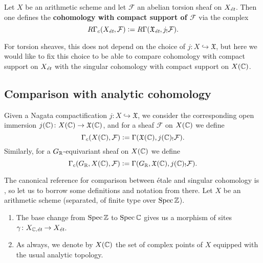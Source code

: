 \documentclass{article}
\numberwithin{equation}{section}
\begin{document}
\begin{appendices}
\begin{definition}
  Let $X$ be an arithmetic scheme and let $\mathcal{F}$ an abelian torsion
  sheaf on $X_\et$. Then one defines the
  \textbf{cohomology with compact support of $\mathcal{F}$} via the complex
  \begin{equation}
    \label{eqn:RGammac-via-extension-by-zero}
    R\Gamma_c (X_\et, \mathcal{F}) \dfn
    R\Gamma (\mathfrak{X}_\text{\it \'et}, j_! \mathcal{F}).
  \end{equation}
\end{definition}

For torsion sheaves, this does not depend on the choice of
$j\colon X \hookrightarrow \mathfrak{X}$, but here we would like to fix this
choice to be able to compare cohomology with compact support on $X_\et$ with
the singular cohomology with compact support on $X (\CC)$.

\subsection*{Comparison with analytic cohomology}

\begin{definition}
  Given a Nagata compactification $j\colon X\hookrightarrow \mathfrak{X}$,
  we consider the corresponding open immersion
  $j (\CC)\colon X (\CC) \to \mathfrak{X} (\CC)$,
  and for a sheaf $\mathcal{F}$ on $X (\CC)$ we define
  \[ \Gamma_c (X (\CC), \mathcal{F}) \dfn
  \Gamma (\mathfrak{X} (\CC), j (\CC)_! \mathcal{F}). \]
  Similarly, for a $G_\RR$-equivariant sheaf on $X (\CC)$ we define
  \[ \Gamma_c (G_\RR, X (\CC), \mathcal{F}) \dfn
  \Gamma (G_\RR, \mathfrak{X} (\CC), j (\CC)_! \mathcal{F}). \]
\end{definition}

The canonical reference for comparison between étale and singular cohomology is
\cite[Exposé~XI, \S 4]{SGA4}, so let us to borrow some definitions and notation
from there. Let $X$ be an arithmetic scheme (separated, of finite type over
$\Spec \ZZ$).

\begin{enumerate}
\item The base change from $\Spec \ZZ$ to $\Spec \CC$ gives us a morphism of
  sites
  $\gamma\colon X_{\CC,\text{\it ét}} \to X_\et$.

\item As always, we denote by $X (\CC)$ the set of complex points of $X$
  equipped with the usual analytic topology.


\end{enumerate}
\end{appendices}
\end{document}
